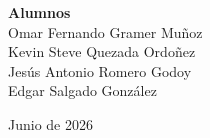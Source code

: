 \begin{titlepage}
\begin{minipage}{0.92\textwidth}
        \vspace{0.45cm}

        \begin{nota}
            \centering
            \textbf{Alumnos}\\[0.25cm]
            Omar Fernando Gramer Muñoz\\
            Kevin Steve Quezada Ordoñez\\
            Jesús Antonio Romero Godoy\\
            Edgar Salgado González
        \end{nota}
    \end{minipage}

    \vspace{0.85cm}
    {\large Junio de 2026\par}
\end{titlepage}
